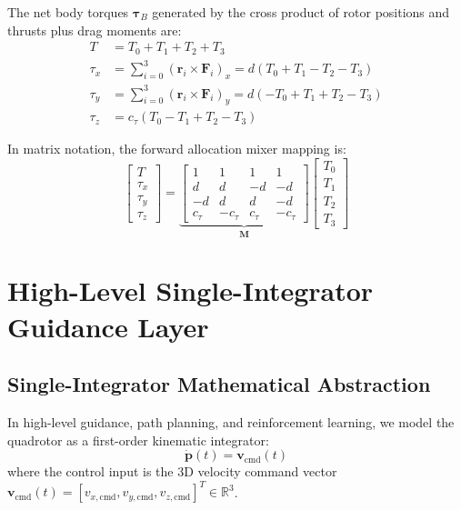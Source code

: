 \documentclass[11pt,a4paper]{article}
\begin{document}
The net body torques $\boldsymbol{\tau}_B$ generated by the cross product of rotor positions and thrusts plus drag moments are:
\begin{align}
T &= T_0 + T_1 + T_2 + T_3 \label{eq:mix_t} \\
\tau_x &= \sum_{i=0}^3 (\mathbf{r}_i \times \mathbf{F}_i)_x = d (T_0 + T_1 - T_2 - T_3) \label{eq:mix_tx} \\
\tau_y &= \sum_{i=0}^3 (\mathbf{r}_i \times \mathbf{F}_i)_y = d (-T_0 + T_1 + T_2 - T_3) \label{eq:mix_ty} \\
\tau_z &= c_\tau (T_0 - T_1 + T_2 - T_3) \label{eq:mix_tz}
\end{align}

In matrix notation, the forward allocation mixer mapping is:
\begin{equation}
\begin{bmatrix} T \\ \tau_x \\ \tau_y \\ \tau_z \end{bmatrix} =
\underbrace{\begin{bmatrix}
1 & 1 & 1 & 1 \\
d & d & -d & -d \\
-d & d & d & -d \\
c_\tau & -c_\tau & c_\tau & -c_\tau
\end{bmatrix}}_{\mathbf{M}}
\begin{bmatrix} T_0 \\ T_1 \\ T_2 \\ T_3 \end{bmatrix}
\label{eq:forward_mixer}
\end{equation}

\newpage

\section{High-Level Single-Integrator Guidance Layer}

\subsection{Single-Integrator Mathematical Abstraction}
In high-level guidance, path planning, and reinforcement learning, we model the quadrotor as a first-order kinematic integrator:
\begin{equation}
\mathbf{\dot{p}}(t) = \mathbf{v}_{\mathrm{cmd}}(t)
\label{eq:single_integrator}
\end{equation}
where the control input is the 3D velocity command vector $\mathbf{v}_{\mathrm{cmd}}(t) = [v_{x,\mathrm{cmd}}, v_{y,\mathrm{cmd}}, v_{z,\mathrm{cmd}}]^T \in \mathbb{R}^3$.
\end{document}
